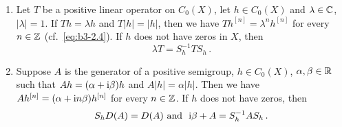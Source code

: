 \begin{theorem}\label{thm:b3-2.4}
\begin{enumerate}[\upshape (i)]	
\item
Let $T$ be a positive linear operator on $C_{0}(X)$, let $h \in C_{0}(X)$ and $\lambda \in \mathbb{C}$, $|\lambda| = 1$.
	If $Th = \lambda h$ and $T|h| = |h|$, then we have $Th^{[n]} = \lambda^{n}h^{[n]}$ for every $n \in \mathbb{Z}$ (cf.\ \eqref{eq:b3-2.4}).
	If $h$ does not have zeros in $X$, then 
	\[
	\lambda T = S_{h}^{-1}TS_{h}\,.
	\]
\item
Suppose $A$ is the generator of a positive semigroup, $h \in C_{0}(X)$, $\alpha,\beta \in \mathbb{R}$ such that $Ah = (\alpha+\mathrm{i}\beta )h$ and $A|h| = \alpha|h|$. 
	Then we have $Ah^{[n]} = (\alpha+\mathrm{i} n\beta)h^{[n]}$ for every $n \in \mathbb{Z}$.
	If $h$ does not have zeros, then 
	\[
	S_{h}D(A) = D(A) \text{ and \ } \mathrm{i}\beta + A = S_{h}^{-1}AS_{h}\,.
	\]
\end{enumerate}
\end{theorem}
